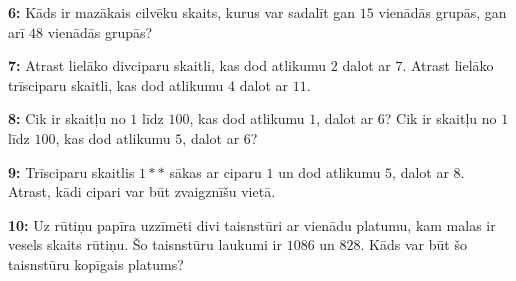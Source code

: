 \documentclass[11pt]{article}
\newenvironment{uzdevums}[1][\unskip]{%
\vspace{3mm}
\noindent
\textbf{#1:}
\noindent}
{}
\begin{document}
\begin{uzdevums}[6]
Kāds ir mazākais cilvēku skaits, kurus var sadalīt gan $15$ vienādās grupās, gan arī $48$ vienādās grupās? 
\end{uzdevums}

\begin{uzdevums}[7]
Atrast lielāko divciparu skaitli, kas dod atlikumu $2$ dalot ar $7$. 
Atrast lielāko trīsciparu skaitli, kas dod atlikumu $4$ dalot ar $11$. 
\end{uzdevums}

\begin{uzdevums}[8]
Cik ir skaitļu no $1$ līdz $100$, kas dod atlikumu $1$, dalot ar $6$? 
Cik ir skaitļu no $1$ līdz $100$, kas dod atlikumu $5$, dalot ar $6$? 
\end{uzdevums}

\begin{uzdevums}[9]
Trīsciparu skaitlis $1\ast\ast$ sākas ar ciparu $1$ un dod atlikumu $5$, dalot ar $8$. 
Atrast, kādi cipari var būt zvaigznīšu vietā. 
\end{uzdevums}

\begin{uzdevums}[10]
Uz rūtiņu papīra uzzīmēti divi taisnstūri ar vienādu platumu, kam malas ir vesels skaits rūtiņu. 
Šo taisnstūru laukumi ir $1086$ un $828$. Kāds var būt šo taisnstūru kopīgais platums? 
\end{uzdevums}
\end{document}

